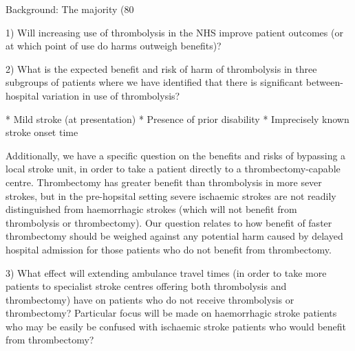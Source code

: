 \begin{markdown}
Background: The majority (80%

1) Will increasing use of thrombolysis in the NHS improve patient outcomes (or at which point of use do harms outweigh benefits)?

2) What is the expected benefit and risk of harm of thrombolysis in three subgroups of patients where we have identified that there is significant between-hospital variation in use of thrombolysis?

    * Mild stroke (at presentation)
    * Presence of prior disability
    * Imprecisely known stroke onset time
   
Additionally, we have a specific question on the benefits and risks of bypassing a local stroke unit, in order to take a patient directly to a thrombectomy-capable centre. Thrombectomy has greater benefit than thrombolysis in more sever strokes, but in the pre-hopsital setting severe ischaemic strokes are not readily distinguished from haemorrhagic strokes (which will not benefit from thrombolysis or thrombectomy). Our question relates to how benefit of faster thrombectomy should be weighed against any potential harm caused by delayed hospital admission for those patients who do not benefit from thrombectomy.

3) What effect will extending ambulance travel times (in order to take more patients to specialist stroke centres offering both thrombolysis and thrombectomy) have on patients who do not receive thrombolysis or thrombectomy? Particular focus will be made on haemorrhagic stroke patients who may be easily be confused with ischaemic stroke patients who would benefit from thrombectomy?




\end{markdown}

